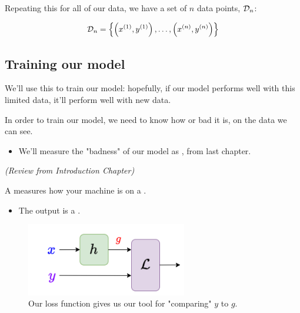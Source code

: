        Repeating this for all of our data, we have a set of $n$ data points, ${\cal D}_n$:
        
        \begin{equation*}
            {\cal D}_n = 
            \left\{  
            \left(x^{(1)}, y^{(1)}\right), \dots,
            \left(x^{(n)}, y^{(n)}\right)
            \right\}
        \end{equation*}

    \phantom{}
        
    \subsection{Training our model}

        We'll use this  to train our model: hopefully, if our model performs well with this limited data, it'll perform well with new data.

        In order to train our model, we need to know how  or bad it is, on the data we can see.

        \begin{itemize}
            \item We'll measure the "badness" of our model as , from last chapter.\\
        \end{itemize}

        

        \begin{definition}
            \textit{(Review from Introduction Chapter)}
        
            A   measures how  your machine is  on a .

            \begin{itemize}
                \item The output is a .
            \end{itemize}
        \end{definition}
        

        \begin{figure}[H]
            \centering
            \includegraphics[width=70mm,scale=0.5]{images/regression_images/hypothesis_loss.png}
            \caption*{Our loss function gives us our tool for "comparing" $y$ to $g$.}
        \end{figure}


